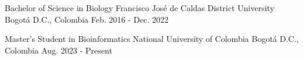 


\begin{cventries}
    
    \cventry
    {Bachelor of Science in Biology} %
    {Francisco José de Caldas District University} %
    {Bogotá D.C., Colombia} %
    {Feb. 2016 - Dec. 2022} %
    { %
    }
    
    
    \cventry
    {Master’s Student in Bioinformatics} %
    {National University of Colombia} %
    {Bogotá D.C., Colombia} %
    {Aug. 2023 - Present} %
    { %
    }
    
    \end{cventries}
    
